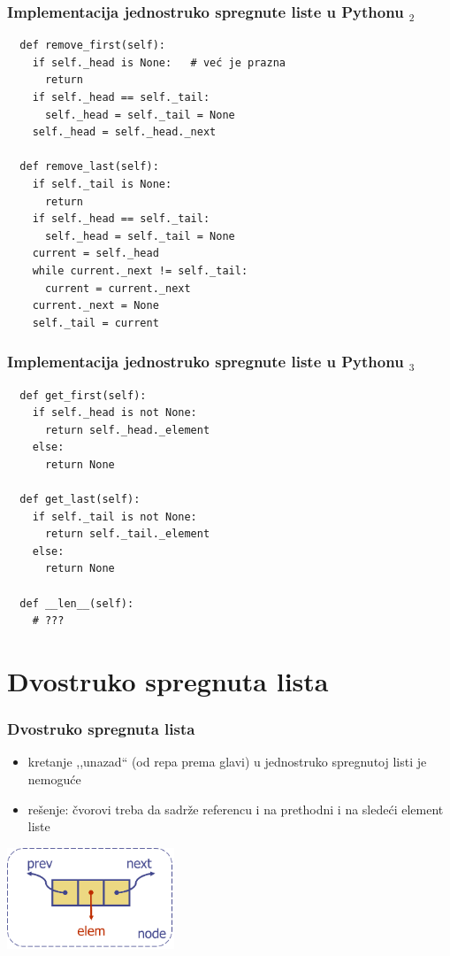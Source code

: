 \documentclass[compress,aspectratio=169]{beamer}
\begin{document}
\begin{frame}
  \frametitle{Implementacija jednostruko spregnute liste u Pythonu $_2$}
\begin{verbatim}
  def remove_first(self):
    if self._head is None:   # već je prazna
      return
    if self._head == self._tail:
      self._head = self._tail = None
    self._head = self._head._next
    
  def remove_last(self):
    if self._tail is None:
      return
    if self._head == self._tail:
      self._head = self._tail = None
    current = self._head
    while current._next != self._tail:
      current = current._next
    current._next = None
    self._tail = current
\end{verbatim}
\end{frame}

\begin{frame}
  \frametitle{Implementacija jednostruko spregnute liste u Pythonu $_3$}
\begin{verbatim}
  def get_first(self):
    if self._head is not None:
      return self._head._element
    else:
      return None
        
  def get_last(self):
    if self._tail is not None:
      return self._tail._element
    else:
      return None
  
  def __len__(self):
    # ???
\end{verbatim}
\end{frame}

\section[2-Lista]{Dvostruko spregnuta lista}
\begin{frame}[fragile]
  \frametitle{Dvostruko spregnuta lista}
  \begin{itemize}
    \item kretanje ,,unazad`` (od repa prema glavi) u jednostruko spregnutoj listi je nemoguće
    \item rešenje: čvorovi treba da sadrže referencu i na prethodni i na sledeći element liste
  \end{itemize}
  \begin{center}
    \includegraphics[width=5cm]{asp-07-pic06.png}
  \end{center}
\end{frame}
\end{document}
